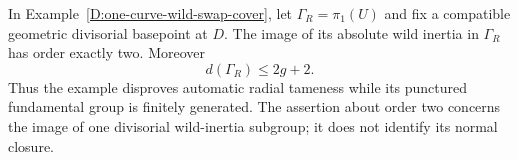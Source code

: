 \begin{corollary}
\label{D:wild-swap-exact-image}
In Example~\ref{D:one-curve-wild-swap-cover}, let
$\Gamma_R=\pi_1(U)$ and fix a compatible geometric
divisorial basepoint at $D$. The image of its absolute
wild inertia in $\Gamma_R$ has order exactly two.
Moreover
\[
                         d(\Gamma_R)\leq2g+2.
                                                        \tag{D.WE.1}
\]
Thus the example disproves automatic radial tameness
while its punctured fundamental group is finitely
generated. The assertion about order two concerns
the image of one divisorial wild-inertia subgroup;
it does not identify its normal closure.
\end{corollary}

